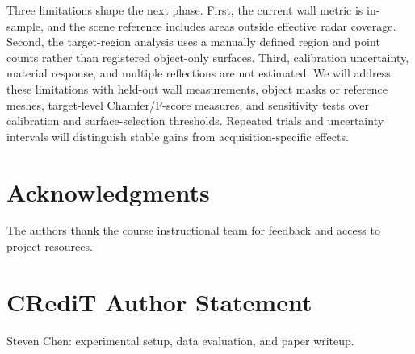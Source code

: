 \documentclass[conference]{IEEEtran}
\begin{document}
Three limitations shape the next phase. First, the current wall metric is in-sample, and the scene reference includes areas outside effective radar coverage. Second, the target-region analysis uses a manually defined region and point counts rather than registered object-only surfaces. Third, calibration uncertainty, material response, and multiple reflections are not estimated. We will address these limitations with held-out wall measurements, object masks or reference meshes, target-level Chamfer/F-score measures, and sensitivity tests over calibration and surface-selection thresholds. Repeated trials and uncertainty intervals will distinguish stable gains from acquisition-specific effects.

\section{Acknowledgments}
The authors thank the course instructional team for feedback and access to project resources.

\section*{CRediT Author Statement}
Steven Chen: experimental setup, data evaluation, and paper writeup.

\balance


\end{document}
